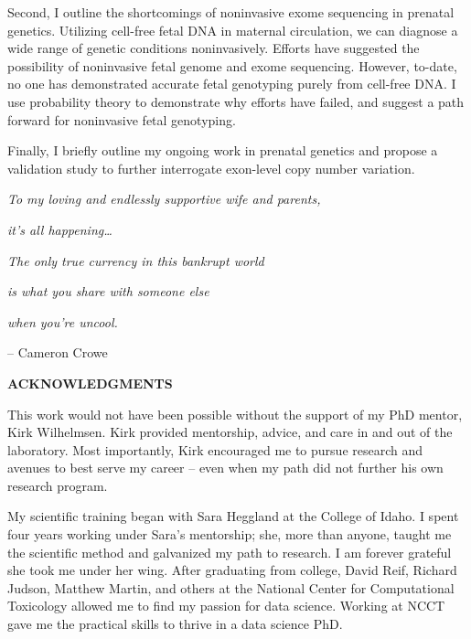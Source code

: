 \documentclass[11pt,letterpaper,oneside]{book}
\newcommand{\mytwoin}[1]{
\vspace*{0.6875in}
\begin{center}
\bfseries\MakeUppercase{#1}
\end{center}
}
\begin{document}
  Second, I outline the shortcomings of noninvasive exome sequencing in prenatal genetics.
  Utilizing cell-free fetal DNA in maternal circulation, we can diagnose a wide range of genetic conditions noninvasively.
  Efforts have suggested the possibility of noninvasive fetal genome and exome sequencing.
  However, to-date, no one has demonstrated accurate fetal genotyping purely from cell-free DNA.
  I use probability theory to demonstrate why efforts have failed, and suggest a path forward for noninvasive fetal genotyping.

  Finally, I briefly outline my ongoing work in prenatal genetics and propose a validation study to further interrogate exon-level copy number variation.

  \clearpage
  \vspace*{0.75in}
  \begin{center}
    \emph{To my loving and endlessly supportive wife and parents,}

    \emph{it's all happening\ldots{}}

    \vspace{3in}
    \flushright

    \emph{The only true currency in this bankrupt world}

    \emph{is what you share with someone else}

    \emph{when you're uncool.}

    -- Cameron Crowe
  \end{center}

  \clearpage
  \mytwoin{Acknowledgments}
  
  This work would not have been possible without the support of my PhD mentor, Kirk Wilhelmsen.
  Kirk provided mentorship, advice, and care in and out of the laboratory.
  Most importantly, Kirk encouraged me to pursue research and avenues to best serve my career -- even when my path did not further his own research program.

  My scientific training began with Sara Heggland at the College of Idaho.
  I spent four years working under Sara's mentorship; she, more than anyone, taught me the scientific method and galvanized my path to research.
  I am forever grateful she took me under her wing.
  After graduating from college, David Reif, Richard Judson, Matthew Martin, and others at the National Center for Computational Toxicology allowed me to find my passion for data science.
  Working at NCCT gave me the practical skills to thrive in a data science PhD.
\end{document}
